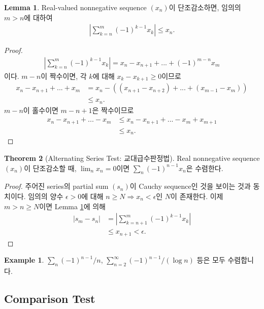 \documentclass[12pt]{article}
\theoremstyle{definition}
\newtheorem{thm}{Theorem}[section]
\newtheorem{lem}[thm]{Lemma}
\newtheorem*{ex}{Example}
\def\eps{\epsilon}
\newcommand{\abs}[1]{\left\vert#1\right\vert}
\begin{document}
	\begin{lem} \label{alt}
		Real-valued nonnegative sequence \((x_n)\)이 단조감소하면, 임의의 \(m > n\)에 대하여
		\begin{align*}
			\abs{\sum_{k=n}^{m} (-1)^{k-1} x_k} \le x_n.
		\end{align*}
	\end{lem}
	\begin{proof}
		\begin{align*}
			\abs{\sum_{k=n}^{m} (-1)^{k-1} x_k} = x_n - x_{n+1} + ... + (-1)^{m-n} x_m
		\end{align*}
		이다. \(m-n\)이 짝수이면, 각 \(k\)에 대해 \(x_k - x_{k+1} \ge 0\)이므로
		\begin{align*}
			x_n - x_{n+1} + ... + x_m &= x_n -((x_{n+1} - x_{n+2}) + ... + (x_{m-1} - x_m))\\
			& \le x_n.
		\end{align*}
		\(m-n\)이 홀수이면 \(m-n+1\)은 짝수이므로
		\begin{align*}
			x_n - x_{n+1} + ... - x_m &\le x_n - x_{n+1} + ... - x_m + x_{m+1}\\
			& \le x_n.
		\end{align*}
	\end{proof}

	\begin{thm}[Alternating Series Test: 교대급수판정법]
		Real nonnegative sequence \((x_n)\)이 단조감소할 때, \(\lim_n x_n = 0\)이면 \(\sum_n (-1)^{n-1} x_n\)은 수렴한다.
	\end{thm}
	\begin{proof}
		주어진 series의 partial sum \((s_n)\)이 Cauchy sequence인 것을 보이는 것과 동치이다. 임의의 양수 \(\eps > 0\)에 대해 \(n \ge N \Longrightarrow x_n < \eps\)인 \(N\)이 존재한다. 이제 \(m > n \ge N\)이면 Lemma \ref{alt}에 의해
		\begin{align*}
			\abs{s_m - s_n} &= \abs{\sum_{k=n+1}^m (-1)^{k-1} x_k}\\
			& \le x_{n+1} < \eps.
		\end{align*}
	\end{proof}

	\begin{ex}
		\(\sum_n (-1)^{n-1}/n\), \(\sum_{n=2}^\infty (-1)^{n-1}/(\log n)\) 등은 모두 수렴합니다.
	\end{ex}


\subsection{Comparison Test}
\end{document}
